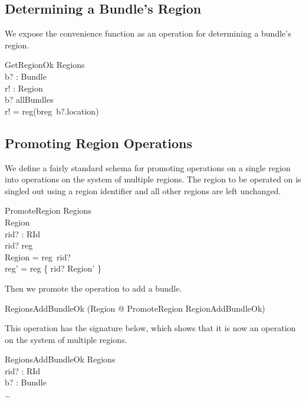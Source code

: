 \documentclass[a4paper,9pt]{article}
\begin{document}
\subsection{Determining a Bundle's Region}

We expose the convenience function as an operation for determining a bundle's region.
\begin{schema}{GetRegionOk}
  \Xi Regions \\
  b? : Bundle \\
  r! : Region \\
\where
  b? \in allBundles \\
  r! = reg(breg~b?.location) \\
\end{schema}

\subsection{Promoting Region Operations}

We define a fairly standard schema for promoting operations on a single region into
operations on the system of multiple regions.
The region to be operated on is singled out using a region identifier and all other regions are left
unchanged.
\begin{schema}{PromoteRegion}
  \Delta Regions \\
  \Delta Region \\
  rid? : RId \\
\where
  rid? \in \dom reg \\
  \theta Region = reg~rid? \\
  reg' = reg \oplus \{ rid? \mapsto \theta Region' \} \\
\end{schema}

Then we promote the operation to add a bundle.
\begin{zed}
  RegionsAddBundleOk  (\exists \Delta Region @ PromoteRegion \land RegionAddBundleOk) \\
\end{zed}

This operation has the signature below, which shows that it is now an operation on the
system of multiple regions.
\begin{schema}{RegionsAddBundleOk}
  \Delta Regions \\
  rid? : RId \\
  b? : Bundle \\
\where
  \ldots
\end{schema}
\end{document}
